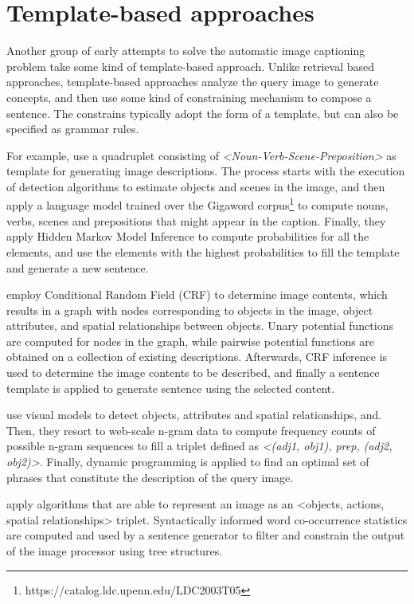 \section{Template-based approaches}

Another group of early attempts to solve the automatic image captioning problem take some kind of template-based approach. Unlike retrieval based approaches, template-based approaches analyze the query image to generate concepts, and then use some kind of constraining mechanism to compose a sentence. The constrains typically adopt the form of a template, but can also be specified as grammar rules.

For example, \citet{Yang2011} use a quadruplet consisting of \textit{<Noun-Verb-Scene-Preposition>} as template for generating image descriptions. The process starts with the execution of detection algorithms to estimate objects and scenes in the image, and then apply a language model trained over the Gigaword corpus\footnote{https://catalog.ldc.upenn.edu/LDC2003T05} to compute nouns, verbs, scenes and prepositions that might appear in the caption. Finally, they apply Hidden Markov Model Inference to compute probabilities for all the elements, and use the elements with the highest probabilities to fill the template and generate a new sentence.

\citet{Kulkarni2011} employ Conditional Random Field (CRF) to determine image contents, which results in a graph with nodes corresponding to objects in the image, object attributes, and spatial relationships between objects. Unary potential functions are computed for nodes in the graph, while pairwise potential functions are obtained on a collection of existing descriptions. Afterwards, CRF inference is used to determine the image contents to be described, and finally a sentence template is applied to generate sentence using the selected content.

\citet{Li2011} use visual models to detect objects, attributes and spatial relationships, and. Then, they resort to web-scale n-gram data to compute frequency counts of possible n-gram sequences to fill a triplet defined as \textit{<(adj1, obj1), prep, (adj2, obj2)>}. Finally, dynamic programming is applied to find an optimal set of phrases that constitute the description of the query image.

\citet{Mitchell2012} apply algorithms that are able to represent an image as an <objects, actions, spatial relationships> triplet. Syntactically informed word co-occurrence statistics are computed and used by a sentence generator to filter and constrain the output of the image processor using tree structures.

